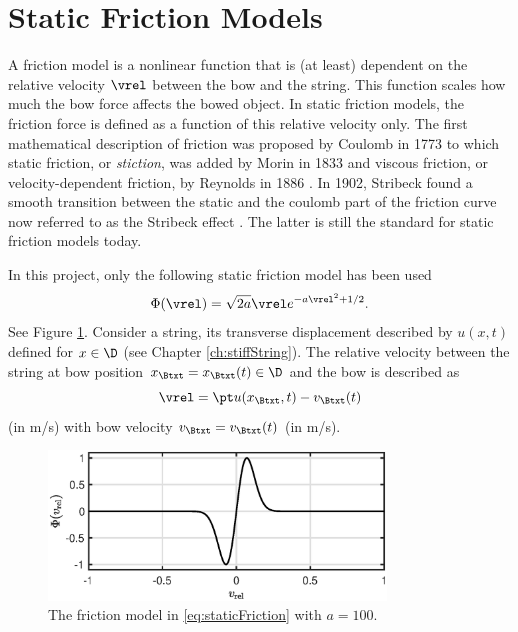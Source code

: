 \section{Static Friction Models}\label{sec:staticFricMod}
A friction model is a nonlinear function that is (at least) dependent on the relative velocity $\vrel$ between the bow and the string. This function scales how much the bow force affects the bowed object. 
In static friction models, the friction force is defined as a function of this relative velocity only.
The first mathematical description of friction was proposed by Coulomb in 1773 \cite{Coulomb1773} to which static friction, or \textit{stiction}, was added by Morin in 1833 \cite{Morin1833} and viscous friction, or velocity-dependent friction, by Reynolds in 1886 \cite{Reynolds1886}. In 1902, Stribeck found a smooth transition between the static and the coulomb part of the friction curve now referred to as the Stribeck effect \cite{Stribeck1902}. The latter is still the standard for static friction models today.

In this project, only the following static friction model has been used \cite{theBible}
\begin{equation}\label{eq:staticFriction}
    \Phi (\vrel) = \sqrt{2a}\vrel e^{-a\vrel^2 + 1/2}.
\end{equation}
See Figure \ref{fig:frictionCharacteristic}. Consider a string, its transverse displacement described by $u(x,t)$ defined for $x\in \D$ (see Chapter \ref{ch:stiffString}). The relative velocity between the string at bow position $x_\Btxt = x_\Btxt(t) \in \D$ and the bow is described as
\begin{equation}\label{eq:vrel}
    \vrel = \pt u(x_\Btxt, t) - v_\Btxt(t)
\end{equation}
(in m/s) with bow velocity $v_\Btxt = v_\Btxt(t)$ (in m/s).

\begin{figure}[h]
    \centering
    \includegraphics[width=0.8\textwidth]{figures/exciters/frictionCharacteristic.eps}
    \caption{The friction model in \eqref{eq:staticFriction} with $a = 100$. \label{fig:frictionCharacteristic}}
\end{figure}

